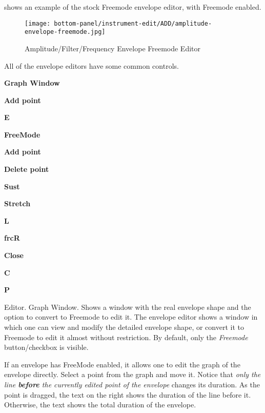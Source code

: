    shows an example of the stock Freemode envelope editor, with
   Freemode enabled.

\begin{figure}[H]
   \centering 
   \texttt{[image: bottom-panel/instrument-edit/ADD/amplitude-envelope-freemode.jpg]}
   \caption{Amplitude/Filter/Frequency Envelope Freemode Editor}
   \label{fig:amplitude_envelope_freemode}
\end{figure}

   All of the envelope editors have some common controls.

   \begin{enumber}
      \item \textbf{Graph Window}
      \item \textbf{Add point}
      \item \textbf{E}
      \item \textbf{FreeMode}
      \item \textbf{Add point}
      \item \textbf{Delete point}
      \item \textbf{Sust}
      \item \textbf{Stretch}
      \item \textbf{L}
      \item \textbf{frcR}
      \item \textbf{Close}
      \item \textbf{C}
      \item \textbf{P}
   \end{enumber}

   \setcounter{ItemCounter}{0}      %

   Editor.  Graph Window.
   Shows a window with the real envelope shape and the option to convert to
   Freemode to edit it.
   The envelope editor shows a window in which one can view and modify the
   detailed envelope shape, or convert it to Freemode to edit it almost
   without restriction.
   By default, only the \textsl{Freemode} button/checkbox is visible.

   If an envelope has FreeMode enabled, it allows one to edit the
   graph of the envelope directly. Select a point from the graph and move it.
   Notice that
   \textsl{only the line \textbf{before} the currently edited point of the
   envelope} changes its duration.
   As the point is dragged, the text on the right shows the duration of
   the line before it. Otherwise, the text shows the total duration of the
   envelope. 

